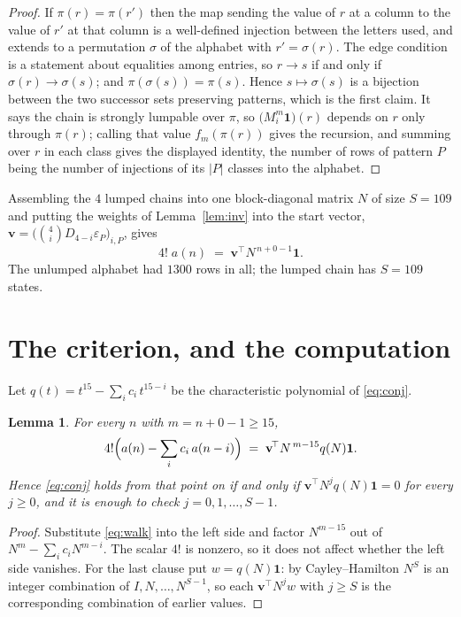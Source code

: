 \documentclass[11pt,a4paper]{article}
\theoremstyle{plain}
\newtheorem{lemma}[theorem]{Lemma}
\theoremstyle{definition}
\begin{document}
\begin{proof}
If $\pi(r)=\pi(r')$ then the map sending the value of $r$ at a column to the value of $r'$
at that column is a well-defined injection between the letters used, and extends to a
permutation $\sigma$ of the alphabet with $r'=\sigma(r)$. The edge condition is a statement
about equalities among entries, so $r\to s$ if and only if $\sigma(r)\to\sigma(s)$; and
$\pi(\sigma(s))=\pi(s)$. Hence $s\mapsto\sigma(s)$ is a bijection between the two successor
sets preserving patterns, which is the first claim. It says the chain is strongly lumpable
over $\pi$, so $\bigl(M_i^{m}\mathbf{1}\bigr)(r)$ depends on $r$ only through $\pi(r)$;
calling that value $f_m(\pi(r))$ gives the recursion, and summing over $r$ in each class
gives the displayed identity, the number of rows of pattern $P$ being the number of
injections of its $|P|$ classes into the alphabet.
\end{proof}

Assembling the $4$ lumped chains into one block-diagonal matrix $N$ of size $S=109$ and
putting the weights of Lemma~\ref{lem:inv} into the start vector,
$\mathbf{v}=\bigl(\binom{4}{i}D_{4-i}\varepsilon_P\bigr)_{i,P}$, gives
\begin{equation}\label{eq:walk}
4!\;a(n)\;=\;\mathbf{v}^{\!\top}N^{\,n+0-1}\mathbf{1} .
\end{equation}
The unlumped alphabet had $1300$ rows in all; the lumped chain has $S=109$ states.

\section{The criterion, and the computation}

Let $q(t)=t^{15}-\sum_i c_i\,t^{15-i}$ be the characteristic polynomial of
\eqref{eq:conj}.

\begin{lemma}\label{lem:crit}
For every $n$ with $m=n+0-1\ge15$,
\[
4!\Bigl(a(n)-\sum_i c_i\,a(n-i)\Bigr)\;=\;\mathbf{v}^{\!\top}N^{\,m-15}q(N)\mathbf{1} .
\]
Hence \eqref{eq:conj} holds from that point on if and only if
$\mathbf{v}^{\!\top}N^{j}q(N)\mathbf{1}=0$ for every $j\ge0$, and it is enough to check
$j=0,1,\dots,S-1$.
\end{lemma}

\begin{proof}
Substitute \eqref{eq:walk} into the left side and factor $N^{m-15}$ out of
$N^{m}-\sum_i c_iN^{m-i}$. The scalar $4!$ is nonzero, so it does not affect whether
the left side vanishes. For the last clause put $w=q(N)\mathbf{1}$: by Cayley--Hamilton
$N^{S}$ is an integer combination of $I,N,\dots,N^{S-1}$, so each
$\mathbf{v}^{\!\top}N^{j}w$ with $j\ge S$ is the corresponding combination of earlier
values.
\end{proof}
\end{document}
